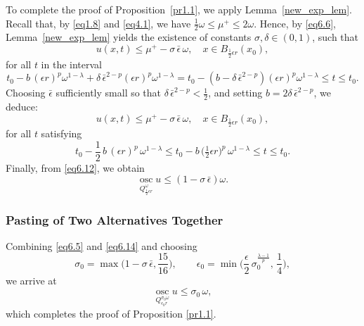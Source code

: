 \documentclass[a4paper,11pt,fullpage]{article}
\DeclareMathOperator*{\osc}{osc}
\numberwithin{equation}{section}
\begin{document}
To complete the proof of Proposition~\ref{pr1.1}, we apply
Lemma~\ref{new_exp_lem}. Recall that, by \eqref{eq1.8} and \eqref{eq4.1}, we have $\frac{1}{2}\omega\leqslant \mu^+\leqslant 2 \omega$. Hence, by \eqref{eq6.6}, Lemma~\ref{new_exp_lem} yields the existence of constants $\sigma, \delta \in (0, 1)$, such that
\begin{equation*}
u(x, t)\leqslant \mu^+-\sigma\,\bar{\epsilon}\,\omega,\quad x\in B_{\frac{1}{2}\epsilon r}(x_0),
\end{equation*}
for all $t$ in the interval
\begin{equation*}
t_0-b\,(\epsilon r)^{p}\omega^{1-\lambda}+\delta\,\bar{\epsilon}^{2-p}(\epsilon r)^{p}\omega^{1-\lambda} = t_0-(b-\delta\,\bar{\epsilon}^{2-p})(\epsilon r)^{p}\omega^{1-\lambda}\leqslant  t\leqslant t_0.
\end{equation*}
Choosing $\bar{\epsilon}$ sufficiently small so that $\delta\,\bar{\epsilon}^{2-p}<\frac{1}{2}$, and setting $b=2\delta\,\bar{\epsilon}^{2-p}$, we deduce:
\begin{equation}\label{eq6.12}
u(x, t)\leqslant \mu^+-\sigma\,\bar{\epsilon}\,\omega,\quad x\in B_{\frac{1}{2}\epsilon r}(x_0),
\end{equation}
for all $t$ satisfying
\begin{equation*}
t_0-\frac{1}{2}\,b\,(\epsilon r)^{p}\,\omega^{1-\lambda}\leqslant t_0-b\,\big(\tfrac{1}{2}\epsilon r\big)^{p}\,\omega^{1-\lambda}\leqslant t\leqslant t_0.
\end{equation*}
Finally, from \eqref{eq6.12}, we obtain
\begin{equation}\label{eq6.14}
\osc\limits_{Q_{\frac{1}{2}\epsilon r}^\omega} u 
\leqslant (1-\sigma\,\bar{\epsilon})\omega.
\end{equation}


\subsubsection{Pasting of Two Alternatives Together}
Combining \eqref{eq6.5} and \eqref{eq6.14} and choosing 
$$\sigma_0=\max\biggr(1-\sigma\,\bar{\epsilon},\frac{15}{16}\biggr),\qquad\epsilon_0=\min\biggr(\frac{\epsilon}{2}\,\sigma_0^\frac{\lambda-1}{p},\,\frac{1}{4}\biggr),$$
we arrive at
\begin{equation}\label{eq6.15}
 \osc\limits_{Q^{\sigma_0 \omega}_{\epsilon_0 r}} u\leqslant \sigma_0\,\omega,
\end{equation}
which completes the proof of Proposition \ref{pr1.1}.
\end{document}
